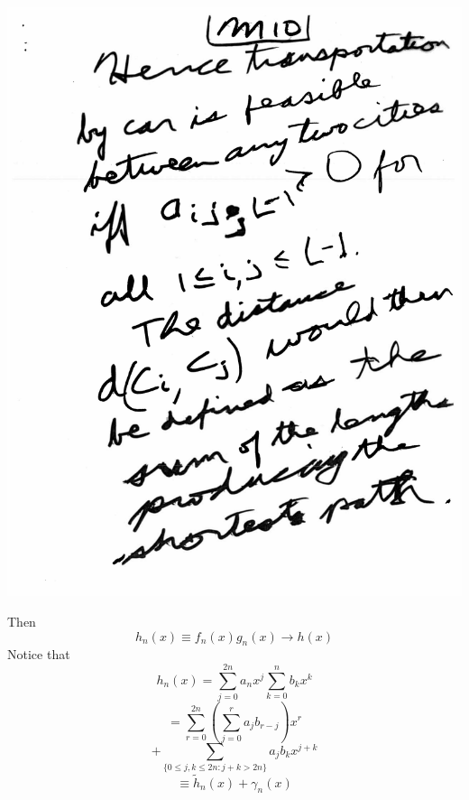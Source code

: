\documentclass[10pt,a4paper]{article}
\begin{document}
\includegraphics[scale=.5]{Pages/MS_10}


\newpage

Then 
$$h_n (x) \equiv f_n (x) g_n (x) \rightarrow h(x)$$ Notice that
$$h_n (x) = \sum_{j=0}^{2n} a_nx^j \sum_{k=0}^n b_kx^k$$ $$= \sum_{r=0}^{2n} (\sum_{j=0}^r a_jb_{r-j})x^r$$ $$+ \sum_{ \{ 0 \leq j, k \leq 2n : j+k > 2n\}} a_jb_kx^{j+k}$$ $$\equiv \tilde{h}_n(x) + \gamma_n(x)$$
\end{document}
